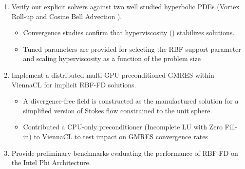 \documentclass[11pt]{report}
\begin{document}
\begin{enumerate}
\item Verify our explicit solvers against two well studied hyperbolic PDEs (Vortex Roll-up \cite{NairTransport05, NairJablonowski08} and Cosine Bell Advection \cite{JakobChien1995}).
\begin{itemize} 
\item Convergence studies confirm that hyperviscosity (\cite{Fornberg2011b}) stabilizes solutions.
\item Tuned parameters are provided for selecting the RBF support parameter and scaling hyperviscosity as a function of the problem size
\end{itemize}
\item Implement a distributed multi-GPU preconditioned GMRES within ViennaCL for implicit RBF-FD solutions.
\begin{itemize} 
\item A divergence-free field is constructed as the manufactured solution for a simplified version of Stokes flow constrained to the unit sphere. 
\item Contributed a CPU-only preconditioner (Incomplete LU with Zero Fill-in) to ViennaCL to test impact on GMRES convergence rates 
\end{itemize}
\item Provide preliminary benchmarks evaluating the performance of RBF-FD on the Intel Phi Architecture. 
\end{enumerate}



\ifstandalone


\end{document}
